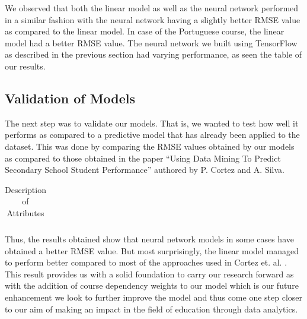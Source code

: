 \documentclass[conference]{IEEEtran}
\begin{document}
We observed that both the linear model as well as the neural network performed in a similar fashion with the neural network having a slightly better RMSE value as compared to the linear model. In case of the Portuguese course, the linear model had a better RMSE value. The neural network we built using TensorFlow \cite{tensorflow2015-whitepaper} as described in the previous section had varying performance, as seen the table of our results.

	\subsection{Validation of Models}
The next step was to validate our models. That is, we wanted to test how well it
performs as compared to a predictive model that has already been applied to the
dataset. This was done by comparing the RMSE values obtained by our models as compared to those obtained in the paper “Using Data Mining To Predict Secondary
School Student Performance” authored by P. Cortez and A. Silva.

\begin{table}[!t]
\renewcommand{\arraystretch}{1.3}
\caption{Description of Attributes}
\label{table:attr-descr}
\centering
\begin{tabular}{|r || l|}
\hline
\hline\hline
\end{tabular}
\end{table}

Thus, the results obtained show that neural network models in some cases have 
obtained a better RMSE value. But most surprisingly, the linear model managed to perform better compared to most of the approaches used in Cortez et. al. \cite{Ref4:}. This result provides us with a solid foundation to carry our research forward as with the addition of course dependency weights to our model which is our future enhancement we look to further improve the model and thus come one step closer to our aim of making an impact in the field of education through data analytics.

\end{document}
